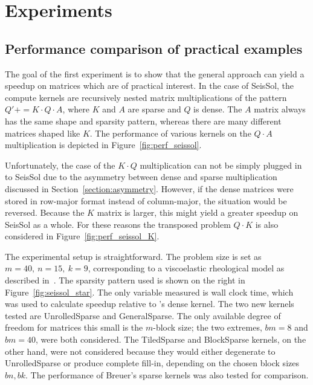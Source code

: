 
\chapter{Experiments}
\label{chapter:experiments}


\section{Performance comparison of practical examples}
\label{section:exp_seissol_star}

The goal of the first experiment is to show that the general approach can yield a speedup on matrices which are of practical interest. In the case of SeisSol, the compute kernels are recursively nested matrix multiplications of the pattern $Q' \mathrel{{+}{=}} K \cdot Q \cdot A$, where $K$ and $A$ are sparse and $Q$ is dense. The $A$ matrix always has the same shape and sparsity pattern, whereas there are many different matrices shaped like $K$. The performance of various kernels on the $Q \cdot A$ multiplication is depicted in Figure~\ref{fig:perf_seissol}. 

Unfortunately, the case of the $K \cdot Q$ multiplication can not be simply plugged in to SeisSol due to the asymmetry between dense and sparse multiplication discussed in Section~\ref{section:asymmetry}. However, if the dense matrices were stored in row-major format instead of column-major, the situation would be reversed. Because the $K$ matrix is larger, this might yield a greater speedup on SeisSol as a whole. For these reasons the transposed problem $Q \cdot K$ is also considered in Figure~\ref{fig:perf_seissol_K}.


The experimental setup is straightforward. The problem size is set as $m=40,~n=15,~k=9$, corresponding to a viscoelastic rheological model as described in~\cite{7568431}. The sparsity pattern used is shown on the right in Figure~\ref{fig:seissol_star}. The only variable measured is wall clock time, which was used to calculate speedup relative to 's dense kernel. The two new kernels tested are UnrolledSparse and GeneralSparse. The only available degree of freedom for matrices this small is the $m$-block size; the two extremes, $bm=8$ and $bm=40$, were both considered. The TiledSparse and BlockSparse kernels, on the other hand, were not considered because they would either degenerate to UnrolledSparse or produce complete fill-in, depending on the chosen block sizes $bn, bk$. The performance of Breuer's sparse kernels was also tested for comparison. 


